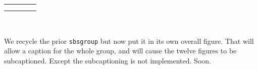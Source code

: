 \documentclass[10pt,]{article}
\theoremstyle{plain}
\theoremstyle{definition}
\theoremstyle{definition}
\theoremstyle{definition}
\theoremstyle{definition}
\theoremstyle{definition}
\theoremstyle{definition}
\numberwithin{equation}{section}
\newlength{\panelmax}
\begin{document}
{\begin{tabular}{@{}*{4}{c}@{}}
\begin{minipage}[c][\panelmax][t]{0.2\linewidth}\usebox{\panelboxCimage}\end{minipage}&
\begin{minipage}[c][\panelmax][t]{0.2\linewidth}\usebox{\panelboxDimage}\end{minipage}\tabularnewline
\parbox[t]{0.2\linewidth}{
}&
\parbox[t]{0.2\linewidth}{
}&
\parbox[t]{0.2\linewidth}{
}&
\parbox[t]{0.2\linewidth}{
}\end{tabular}\\
}%
\hypertarget{p-733}{}%
We recycle the prior \lstinline?sbsgroup? but now put it in its own overall figure.  That will allow a caption for the whole group, and will cause the twelve figures to be subcaptioned.  Except the subcaptioning is not implemented.  Soon.%
\end{document}
